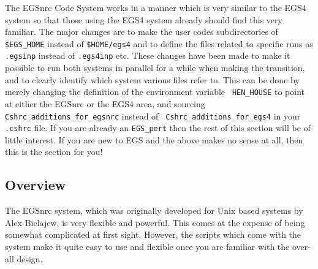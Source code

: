   
The EGSnrc Code System works in a manner which is very similar to the EGS4
system so that those using the EGS4 system already should find this very
familiar.  The major changes are to make
the user codes subdirectories of \verb+$EGS_HOME+ instead of  \verb+$HOME/egs4+ and to
define the files related to specific runs as \verb+.egsinp+ instead of
\verb+.egs4inp+ etc.  These changes have been made to make it possible to
run both systems in parallel for a while when making the transition, and to
clearly identify which system various files refer to.  This can be done by
merely changing the definition  of the environment variable {\tt
HEN\_HOUSE} to point at either the EGSnrc or the EGS4 area,
and sourcing {\tt Cshrc\_additions\_for\_egsnrc} instead of {\tt
Cshrc\_additions\_for\_egs4} in your {\tt .cshrc} file. If you are already
an \verb+EGS_pert+ then the rest of this section will be of little
interest.  If you are new to EGS and the above makes no sense at all, then
this is the section for you!


\subsection{Overview}

The EGSnrc system, which was originally developed for Unix based systems by
Alex Bielajew, is very flexible and powerful.  This comes at the expense of
being somewhat complicated at first sight.  However, the scripts which come
with the system make it quite easy to use and flexible once you are familiar
with the over-all design.

